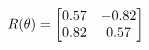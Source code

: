 \documentclass[preview]{standalone}
\begin{document}
\begin{align*}
\special{dvisvgm:raw <g id='unique000'>}R(\theta) = \begin{bmatrix}0.57 & -0.82\\0.82 & 0.57\end{bmatrix}\special{dvisvgm:raw </g>}
\end{align*}
\end{document}
